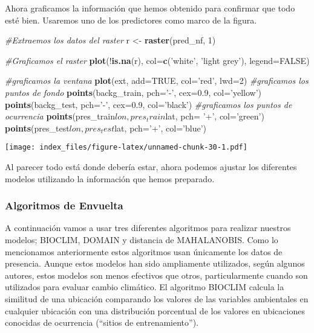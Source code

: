 \documentclass[]{article}
\newenvironment{Shaded}{\begin{snugshade}}{\end{snugshade}}
\newcommand{\KeywordTok}[1]{\textcolor[rgb]{0.13,0.29,0.53}{\textbf{{#1}}}}
\newcommand{\DataTypeTok}[1]{\textcolor[rgb]{0.13,0.29,0.53}{{#1}}}
\newcommand{\DecValTok}[1]{\textcolor[rgb]{0.00,0.00,0.81}{{#1}}}
\newcommand{\FloatTok}[1]{\textcolor[rgb]{0.00,0.00,0.81}{{#1}}}
\newcommand{\StringTok}[1]{\textcolor[rgb]{0.31,0.60,0.02}{{#1}}}
\newcommand{\CommentTok}[1]{\textcolor[rgb]{0.56,0.35,0.01}{\textit{{#1}}}}
\newcommand{\OtherTok}[1]{\textcolor[rgb]{0.56,0.35,0.01}{{#1}}}
\newcommand{\NormalTok}[1]{{#1}}
\begin{document}
Ahora graficamos la información que hemos obtenido para confirmar que
todo esté bien. Usaremos uno de los predictores como marco de la figura.

\begin{Shaded}
\begin{Highlighting}[]
\CommentTok{#Extraemos los datos del raster }
\NormalTok{r <-}\StringTok{ }\KeywordTok{raster}\NormalTok{(pred_nf, }\DecValTok{1}\NormalTok{)}

\CommentTok{#Graficamos el raster}
\KeywordTok{plot}\NormalTok{(!}\KeywordTok{is.na}\NormalTok{(r), }\DataTypeTok{col=}\KeywordTok{c}\NormalTok{(}\StringTok{'white'}\NormalTok{, }\StringTok{'light grey'}\NormalTok{), }\DataTypeTok{legend=}\OtherTok{FALSE}\NormalTok{)}

\CommentTok{#graficamos la ventana}
\KeywordTok{plot}\NormalTok{(ext, }\DataTypeTok{add=}\OtherTok{TRUE}\NormalTok{, }\DataTypeTok{col=}\StringTok{'red'}\NormalTok{, }\DataTypeTok{lwd=}\DecValTok{2}\NormalTok{)}
\CommentTok{#graficamos los puntos de fondo}
\KeywordTok{points}\NormalTok{(backg_train, }\DataTypeTok{pch=}\StringTok{'-'}\NormalTok{, }\DataTypeTok{cex=}\FloatTok{0.9}\NormalTok{, }\DataTypeTok{col=}\StringTok{'yellow'}\NormalTok{)}
\KeywordTok{points}\NormalTok{(backg_test, }\DataTypeTok{pch=}\StringTok{'-'}\NormalTok{,  }\DataTypeTok{cex=}\FloatTok{0.9}\NormalTok{, }\DataTypeTok{col=}\StringTok{'black'}\NormalTok{)}
\CommentTok{#graficamos los puntos de ocurrencia}
\KeywordTok{points}\NormalTok{(pres_train$lon, pres_train$lat, }\DataTypeTok{pch=} \StringTok{'+'}\NormalTok{, }\DataTypeTok{col=}\StringTok{'green'}\NormalTok{)}
\KeywordTok{points}\NormalTok{(pres_test$lon, pres_test$lat, }\DataTypeTok{pch=}\StringTok{'+'}\NormalTok{, }\DataTypeTok{col=}\StringTok{'blue'}\NormalTok{)}
\end{Highlighting}
\end{Shaded}

\texttt{[image: index\_files/figure-latex/unnamed-chunk-30-1.pdf]}

Al parecer todo está donde debería estar, ahora podemos ajustar los
diferentes modelos utilizando la información que hemos preparado.

\subsubsection{Algoritmos de Envuelta}\label{algoritmos-de-envuelta}

A continuación vamos a usar tres diferentes algoritmos para realizar
nuestros modelos; BIOCLIM, DOMAIN y distancia de MAHALANOBIS. Como lo
mencionamos anteriormente estos algoritmos usan únicamente los datos de
presencia. Aunque estos modelos han sido ampliamente utilizados, según
algunos autores, estos modelos son menos efectivos que otros,
particularmente cuando son utilizados para evaluar cambio climático. El
algoritmo BIOCLIM calcula la similitud de una ubicación comparando los
valores de las variables ambientales en cualquier ubicación con una
distribución porcentual de los valores en ubicaciones conocidas de
ocurrencia (``sitios de entrenamiento'').
\end{document}
